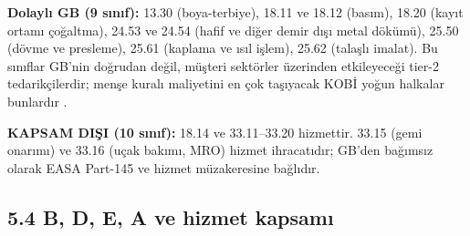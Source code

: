 \endgroup

\textbf{Dolaylı GB (9 sınıf):} 13.30 (boya-terbiye), 18.11 ve 18.12 (basım), 18.20 (kayıt ortamı çoğaltma), 24.53 ve 24.54 (hafif ve diğer demir dışı metal dökümü), 25.50 (dövme ve presleme), 25.61 (kaplama ve ısıl işlem), 25.62 (talaşlı imalat). Bu sınıflar GB'nin doğrudan değil, müşteri sektörler üzerinden etkileyeceği tier-2 tedarikçilerdir; menşe kuralı maliyetini en çok taşıyacak KOBİ yoğun halkalar bunlardır \etiketH{}.

\textbf{KAPSAM DIŞI (10 sınıf):} 18.14 ve 33.11--33.20 hizmettir. 33.15 (gemi onarımı) ve 33.16 (uçak bakımı, MRO) hizmet ihracatıdır; GB'den bağımsız olarak EASA Part-145 ve hizmet müzakeresine bağlıdır.

\hypertarget{00_plan-54-b-d-e-a-ve-hizmet-kapsamux131}{%
\subsection{5.4 B, D, E, A ve hizmet kapsamı}\label{00_plan-54-b-d-e-a-ve-hizmet-kapsamux131}}

\begingroup\gbtablo\footnotesize

